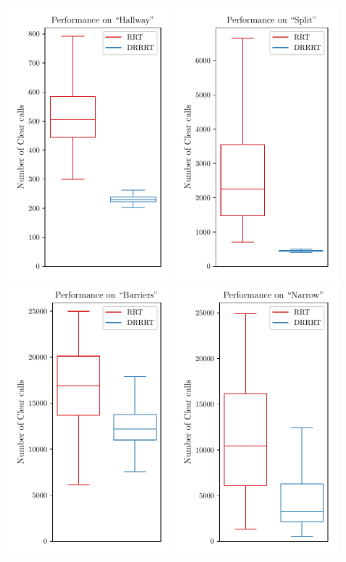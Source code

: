 \documentclass[conference]{IEEEtran}
\begin{document}
\begin{figure}[h]
	\centering
	\includegraphics[width=4.3cm]{figures/hallway_boxplot.pdf}
	\includegraphics[width=4.3cm]{figures/split_boxplot.pdf}
	\includegraphics[width=4.3cm]{figures/barriers_boxplot.pdf}
	\includegraphics[width=4.3cm]{figures/narrow_boxplot.pdf}

\end{figure}
\end{document}
